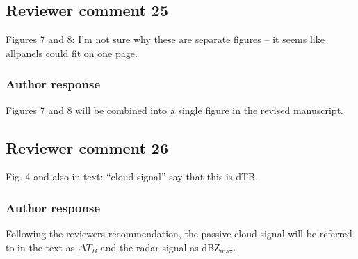 \documentclass[11pt]{scrartcl}
\begin{document}
\subsection*{Reviewer comment 25}
Figures 7 and 8:  I’m not sure why these are separate figures – it seems like allpanels could fit on one page.

\subsubsection*{Author response}

Figures 7 and 8 will be combined into a single figure in the revised manuscript.

\subsection*{Reviewer comment 26}
Fig. 4 and also in text: “cloud signal” say that this is dTB.

\subsubsection*{Author response}

Following the reviewers recommendation, the passive cloud signal will be
referred to in the text as $\Delta T_B$ and the radar signal as
$\text{dBZ}_\text{max}$.

%
%
%
%
\end{document}
